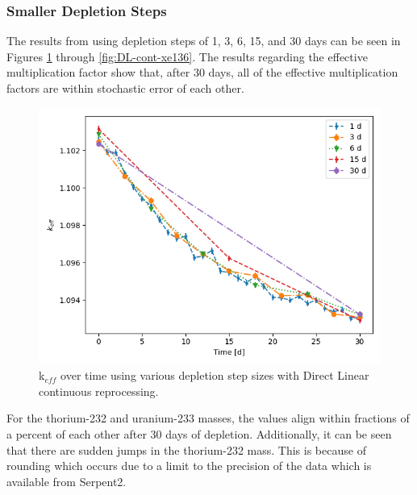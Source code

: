 \subsubsection{Smaller Depletion Steps}

The results from using depletion steps of 1, 3, 6, 15, and 30 days can be seen in Figures \ref{fig:DL-cont-k} through \ref{fig:DL-cont-xe136}. The results regarding the effective multiplication factor show that, after 30 days, all of the effective multiplication factors are within stochastic error of each other.

\begin{figure}[H]
  \centering
  \includegraphics[scale=0.7]{images/DL_NSTEP_keff.png}
  \caption{k$_{eff}$ over time using various depletion step sizes with Direct Linear continuous reprocessing.}
   \label{fig:DL-cont-k}
\end{figure}

For the thorium-232 and uranium-233 masses, the values align within fractions of a percent of each other after 30 days of depletion. Additionally, it can be seen that there are sudden jumps in the thorium-232 mass. This is because of rounding which occurs due to a limit to the precision of the data which is available from Serpent2.

